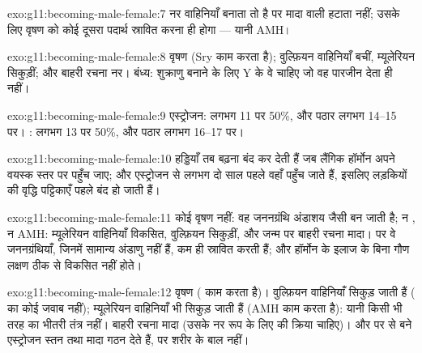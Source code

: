 \begin{solution}{exo:g11:becoming-male-female:7}
 नर वाहिनियाँ बनाता तो है पर मादा वाली हटाता नहीं; उसके लिए
वृषण को कोई दूसरा पदार्थ स्रावित करना ही होगा --- यानी AMH।
\end{solution}

\begin{solution}{exo:g11:becoming-male-female:8}
वृषण (Sry काम करता है); वुल्फ़ियन वाहिनियाँ बचीं, म्यूलेरियन सिकुड़ीं; और
बाहरी रचना नर। बंध्य: शुक्राणु बनाने के लिए Y के वे  चाहिए जो वह पारजीन
देता ही नहीं।
\end{solution}

\begin{solution}{exo:g11:becoming-male-female:9}
एस्ट्रोजन: लगभग 11 पर 50\%, और पठार लगभग 14--15 पर। : लगभग
13 पर 50\%, और पठार लगभग 16--17 पर।
\end{solution}

\begin{solution}{exo:g11:becoming-male-female:10}
हड्डियाँ तब बढ़ना बंद कर देती हैं जब लैंगिक हॉर्मोन अपने वयस्क स्तर पर
पहुँच जाए; और एस्ट्रोजन  से लगभग दो साल पहले वहाँ पहुँच जाते
हैं, इसलिए लड़कियों की वृद्धि पट्टिकाएँ पहले बंद हो जाती हैं।
\end{solution}

\begin{solution}{exo:g11:becoming-male-female:11}
कोई वृषण नहीं: वह जननग्रंथि अंडाशय जैसी बन जाती है; न , न
AMH: म्यूलेरियन वाहिनियाँ विकसित, वुल्फ़ियन सिकुड़ीं, और जन्म पर बाहरी रचना
मादा।  पर वे जननग्रंथियाँ, जिनमें सामान्य अंडाणु नहीं हैं, कम ही
स्रावित करती हैं; और हॉर्मोन के इलाज के बिना गौण लक्षण ठीक से विकसित नहीं
होते।
\end{solution}

\begin{solution}{exo:g11:becoming-male-female:12}
वृषण ( काम करता है)। वुल्फ़ियन वाहिनियाँ सिकुड़ जाती हैं (
का कोई जवाब नहीं); म्यूलेरियन वाहिनियाँ भी सिकुड़ जाती हैं (AMH काम करता
है): यानी किसी भी तरह का भीतरी तंत्र नहीं। बाहरी रचना मादा (उसके नर रूप के
लिए  की क्रिया चाहिए)। और  पर  से बने
एस्ट्रोजन स्तन तथा मादा गठन देते हैं, पर शरीर के बाल नहीं।
\end{solution}

